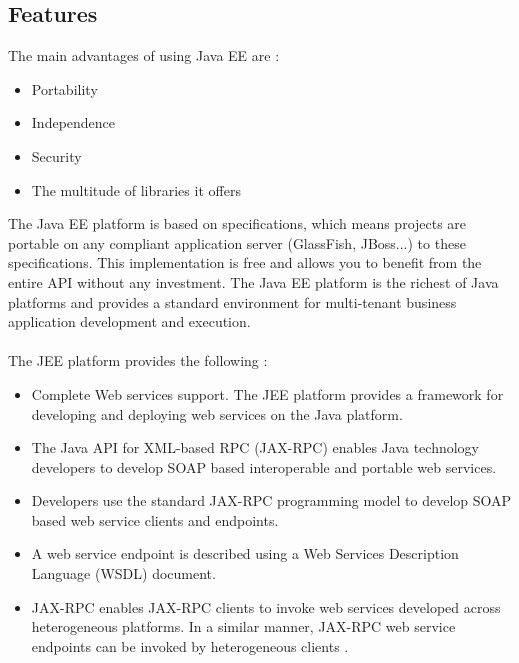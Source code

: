 \subsection{Features}
The main advantages of using Java EE are :
\begin{itemize}
	\item Portability
	\item Independence
	\item Security
	\item The multitude of libraries it offers
\end{itemize}
The Java EE platform is based on specifications, which means projects are portable on any compliant application server (GlassFish, JBoss...) to these specifications. This implementation is free and allows you to benefit from the entire API without any investment. The Java EE platform is the richest of Java platforms and provides a standard environment for multi-tenant business application development and execution. 
\\
\\
The JEE platform provides the following :
\begin{itemize}
	\item Complete Web services support. The JEE platform provides a framework for developing and deploying web services on the Java platform. 
	\item The Java API for XML-based RPC (JAX-RPC) enables Java technology developers to develop SOAP based interoperable and portable web services.
	\item Developers use the standard JAX-RPC programming model to develop SOAP based web service clients and endpoints.
	\item A web service endpoint is described using a Web Services Description Language (WSDL) document.
	\item JAX-RPC enables JAX-RPC clients to invoke web services developed across heterogeneous platforms. In a similar manner, JAX-RPC web service endpoints can be invoked by heterogeneous clients \cite{ref6}.
\end{itemize}

